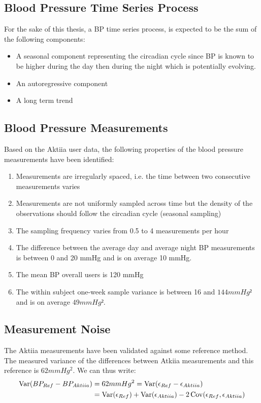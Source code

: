 \subsection{Blood Pressure Time Series Process}\label{subsec:blood-pressure-time-series-process}
For the sake of this thesis, a BP time series process,
is expected to be the sum of the following components:
\begin{itemize}
    \item A seasonal component representing the circadian cycle since BP is known to be higher during the day then during the night
    which is potentially evolving.
    \item An autoregressive component
    \item A long term trend
\end{itemize}


\subsection{Blood Pressure Measurements}\label{subsec:blood-pressure-measurements}
Based on the Aktiia user data, the following properties of
the blood pressure measurements have been identified:
\begin{enumerate}
    \item Measurements are irregularly spaced, i.e. the time between two consecutive measurements varies
    \item Measurements are not uniformly sampled across time but the density of the observations should
    follow the circadian cycle (seasonal sampling)
    \item The sampling frequency varies from 0.5 to 4 measurements per hour
    \item The difference between the average day and average night BP measurements is between
    0 and 20 mmHg and is on average 10 mmHg.
    \item The mean BP overall users is 120 mmHg
    \item The within subject one-week sample variance is between 16 and $144 mmHg²$ and is on average $49 mmHg²$.
\end{enumerate}


\subsection{Measurement Noise}

The Aktiia measurements have been validated against some
reference method.
The measured variance of the differences between Atkiia measurements
and this reference is $62 mmHg^2$.
We can thus write:
\begin{align*}
    \operatorname{Var}(BP_{Ref} - BP_{Aktiia})
    & = 62 mmHg^2 = \operatorname{Var}(\epsilon_{Ref} - \epsilon_{Aktiia}) \\
    & = \operatorname{Var}(\epsilon_{Ref}) + \operatorname{Var}(\epsilon_{Aktiia}) - 2\operatorname{Cov}(\epsilon_{Ref},
    \epsilon_{Aktiia})
\end{align*}

